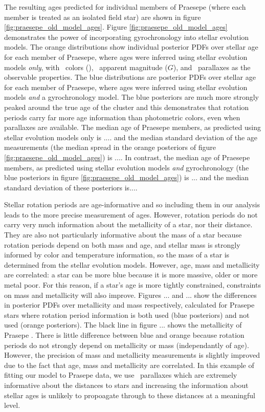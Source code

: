 The resulting ages predicted for individual members of Praesepe (where each
member is treated as an isolated field star) are shown in figure
\ref{fig:praesepe_old_model_ages}.
Figure \ref{fig:praesepe_old_model_ages} demonstrates the power of
incorporating gyrochronology into stellar evolution models.
The orange distributions show individual posterior PDFs over stellar age for
each member of Praesepe, where ages were inferred using stellar evolution
models {\it only}, with \gaia\ colors (\gcolor), \gaia\ apparent magnitude
($G$), and \gaia\ parallaxes as the observable properties.
The blue distributions are posterior PDFs over stellar age for each member of
Praesepe, where ages were inferred using stellar evolution models {\it and}
a gyrochronology model.
The blue posteriors are much more strongly peaked around the true age of the
cluster and this demonstrates that rotation periods carry far more age
information than photometric colors, even when parallaxes are available.
The median age of Praesepe members, as predicted using stellar evolution
models only is .... and the median standard deviation of the age measurements
(the median spread in the orange posteriors of figure
\ref{fig:praesepe_old_model_ages}) is ....
In contrast, the median age of Praesepe members, as predicted using stellar
evolution models {\it and} gyrochronology (the blue posteriors in figure
\ref{fig:praesepe_old_model_ages}) is ... and the median standard deviation of
these posteriors is....

Stellar rotation periods are age-informative and so including them in our
analysis leads to the more precise measurement of ages.
However, rotation periods do not carry very much information about the
metallicity of a star, nor their distance.
They are also not particularly informative about the mass of a star because
rotation periods depend on both mass and age, and stellar mass is strongly
informed by color and temperature information, so the mass of a star is
determined from the stellar evolution models.
However, age, mass and metallicity are correlated: a star can be more blue
because it is more massive, older or more metal poor.
For this reason, if a star's age is more tightly constrained, constraints on
mass and metallicity will also improve.
Figures ... and ... show the differences in posterior PDFs over metallicity
and mass respectively, calculated for Prasepe stars where rotation period
information is both used (blue posteriors) and not used (orange posteriors).
The black line in figure ... shows the metallicity of Prasepe
.
There is little difference between blue and orange because rotation periods do
not strongly depend on metallicity or mass (independantly of age).
However, the precision of mass and metallicity measurements is slightly
improved due to the fact that age, mass and metallicity are correlated.
In this example of fitting our model to Prasepe data, we use \gaia\ parallaxes
which are extremely informative about the distances to stars and increasing
the information about stellar ages is unlikely to propoagate through to these
distances at a meaningful level.

